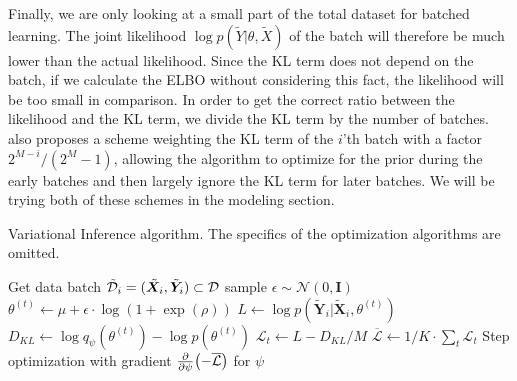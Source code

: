 Finally, we are only looking at a small part of the total dataset for batched learning.
The joint likelihood $\log p(\tilde{Y}|\theta,\tilde{X})$ of the batch will therefore be much lower than the actual likelihood. 
Since the KL term does not depend on the batch, if we calculate the ELBO without considering this fact, the likelihood will be too small in comparison.
In order to get the correct ratio between the likelihood and the KL term, we divide the KL term by the number of batches. 
\cite{blundell_weight_2015} also proposes a scheme weighting the KL term of the $i$'th batch with a factor $2^{M-i}/(2^{M}-1)$, allowing the algorithm to optimize for the prior during the early batches and then largely ignore the KL term for later batches. 
We will be trying both of these schemes in the modeling section.

\begin{algorithm}[htbp]
    \caption{Variational Inference algorithm.
The specifics of the optimization algorithms are omitted.} \label{alg:vi}
    \begin{algorithmic}
        \State Get data batch $\tilde{\mathcal{D}}_i =(\tilde{\bm{X}}_i, \tilde{\bm{Y}}_i)\subset \mathcal{D}$
            \State sample $\epsilon \sim \mathcal{N}(0, \bm{I})$
            \State $\theta^{(t)} \gets \mu + \epsilon \cdot \log(1+\exp(\rho))$
            \State 
            $L \gets 
            \log{p(\tilde{\bm{Y}}_i|\tilde{\bm{X}}_i,\theta^{(t)})}$
            \State $D_{KL} \gets \log q_\psi(\theta^{(t)}) - \log{p(\theta^{(t)})}$
            \State $\mathcal{L}_t \gets L - D_{KL}/M $
        \EndFor
        \State $\overline{\mathcal{L}} \gets 1/K\cdot \sum_t \mathcal{L}_t$
        \State Step optimization with gradient $\pdv{\psi} (-\overline{\mathcal{L}})$ for $\psi$
        \EndFor
    \end{algorithmic}
\end{algorithm}